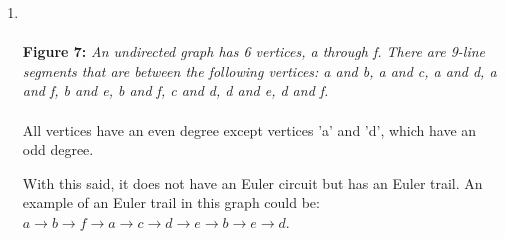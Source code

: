 \documentclass{amsart}
\theoremstyle{definition}
\theoremstyle{Exercise}
\theoremstyle{remark}
\theoremstyle{rule}
\numberwithin{equation}{section}
\begin{document}
\begin{enumerate}[label=(\alph{*})]
		\item {} \\\\
			{\color{blue} {\bf Figure 7:} \emph{ An undirected graph has 6 vertices, a through f. There are 9-line segments that are between the following vertices: a and b, a and c, a and d, a and f, b and e, b and f, c and d, d and e, d and f. } }
			\\\\
			All vertices have an even degree except vertices 'a' and 'd', which have
			an odd degree.

			With this said, it does not have an Euler circuit but has an Euler trail.
			An example of an Euler trail in this graph could be: $a \rightarrow b \rightarrow
			f \rightarrow a \rightarrow c \rightarrow d \rightarrow e \rightarrow b \rightarrow
			e \rightarrow d$. \\\\
			\newpage
			~\\~\\


\end{enumerate}
\end{document}
